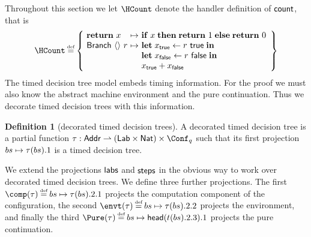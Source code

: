 \documentclass[12pt,phd,lfcs,twoside,openright,logo,leftchapter,normalheadings]{infthesis}
\theoremstyle{plain}
\theoremstyle{definition}
\newtheorem{definition}[theorem]{Definition}
\begin{document}
Throughout this section we let $\HCount$ denote the handler definition
of $\mathsf{count}$, that is
%
\[
  \HCount \defas
  \left\{
    \ba[m]{@{~}l@{~}c@{~}l}
      \Return~x           &\mapsto& \If\;x\;\Then\; \Return~1 \;\Else\; \Return~0\\
      \Branch~\Unit~r  &\mapsto&
      \ba[t]{@{}l}
        \Let\; x_\True \revto r~\True \; \In\\
        \Let\; x_\False \revto r~\False \; \In\\
        x_\True + x_\False
      \ea
    \ea
  \right\}
\]
%
The timed decision tree model embeds timing information. For the proof
we must also know the abstract machine environment and the pure
continuation. Thus we decorate timed decision trees with this
information.
%
\begin{definition}[decorated timed decision trees]
  A decorated timed decision tree is a partial function $\tree :
  \Addr \pto (\Lab \times \Nat) \times \Conf_q$ such
  that its first projection $bs \mapsto \tau(bs).1$ is a timed
  decision tree.
\end{definition}
%
We extend the projections $\mathsf{labs}$ and $\mathsf{steps}$ in the obvious way to
work over decorated timed decision trees.  We define three further
projections. The first $\comp(\tree) \defas bs \mapsto \tree(bs).2.1$
projects the computation component of the configuration, the second
$\envt(\tree) \defas bs \mapsto \tree(bs).2.2$ projects the
environment, and finally the third
$\Pure(\tree) \defas bs \mapsto \mathsf{head}(t(bs).2.3).1$ projects
the pure continuation.
\end{document}
